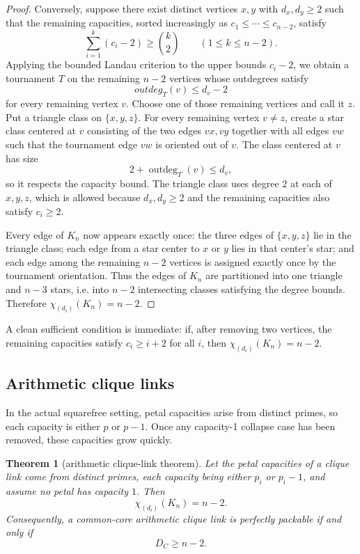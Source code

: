 \documentclass[11pt]{article}
\newtheorem{theorem}{Theorem}[section]
\theoremstyle{definition}
\newcommand{\Chi}{\chi}
\newcommand{\outdeg}{\operatorname{outdeg}}
\begin{document}
\begin{proof}
Conversely, suppose there exist distinct vertices \(x,y\) with \(d_x,d_y\ge 2\) such that the remaining capacities, sorted increasingly as \(c_1\le \cdots\le c_{n-2}\), satisfy
\[
\sum_{i=1}^k (c_i-2)\ge \binom{k}{2}
\qquad(1\le k\le n-2).
\]
Applying the bounded Landau criterion to the upper bounds \(c_i-2\), we obtain a tournament \(T\) on the remaining \(n-2\) vertices whose outdegrees satisfy
\[
outdeg_T(v)\le d_v-2
\]
for every remaining vertex \(v\). Choose one of those remaining vertices and call it \(z\). Put a triangle class on \(\{x,y,z\}\). For every remaining vertex \(v\neq z\), create a star class centered at \(v\) consisting of the two edges \(vx,vy\) together with all edges \(vw\) such that the tournament edge \(vw\) is oriented out of \(v\). The class centered at \(v\) has size
\[
2+\outdeg_T(v)\le d_v,
\]
so it respects the capacity bound. The triangle class uses degree \(2\) at each of \(x,y,z\), which is allowed because \(d_x,d_y\ge 2\) and the remaining capacities also satisfy \(c_i\ge 2\).

Every edge of \(K_n\) now appears exactly once: the three edges of \(\{x,y,z\}\) lie in the triangle class; each edge from a star center to \(x\) or \(y\) lies in that center's star; and each edge among the remaining \(n-2\) vertices is assigned exactly once by the tournament orientation. Thus the edges of \(K_n\) are partitioned into one triangle and \(n-3\) stars, i.e. into \(n-2\) intersecting classes satisfying the degree bounds. Therefore \(\Chi_{(d_i)}(K_n)=n-2\).
\end{proof}

A clean sufficient condition is immediate: if, after removing two vertices, the remaining capacities satisfy \(c_i\ge i+2\) for all \(i\), then \(\Chi_{(d_i)}(K_n)=n-2\).

\subsection{Arithmetic clique links}
In the actual squarefree setting, petal capacities arise from distinct primes, so each capacity is either \(p\) or \(p-1\). Once any capacity-1 collapse case has been removed, these capacities grow quickly.

\begin{theorem}[arithmetic clique-link theorem]\label{thm:arith-clique}
Let the petal capacities of a clique link come from distinct primes, each capacity being either \(p_i\) or \(p_i-1\), and assume no petal has capacity \(1\). Then
\[
\Chi_{(d_i)}(K_n)=n-2.
\]
Consequently, a common-core arithmetic clique link is perfectly packable if and only if
\[
D_C\ge n-2.
\]
\end{theorem}
\end{document}
